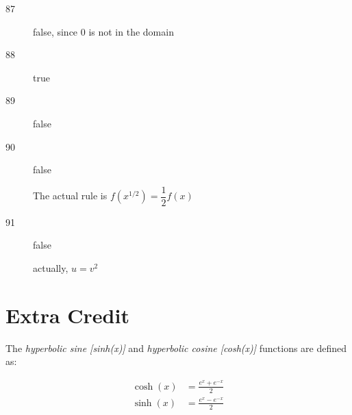 \documentclass[fleqn,addpoints]{exam}
\begin{document}
\begin{description}
\begin{description}
\item[87] 
false, since 0 is not in the domain

\item[88]
true

\item[89]
false

\item[90]
false

The actual rule is $f(x^{1/2}) = \dfrac{1}{2} f(x)$

\item[91]
false

actually, $u = v^2$

\end{description}
\end{description}
\fi

\section{Extra Credit}
The {\em hyperbolic sine [sinh(x)]} and {\em hyperbolic cosine [cosh(x)]} functions are defined as:


\begin{align*}
  \cosh(x) &= \frac{e^x + e^{-x}}{2} \\
  \sinh(x) &= \frac{e^x - e^{-x}}{2} \\
\end{align*}
\end{document}
